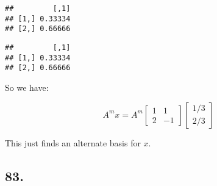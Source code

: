 \documentclass[]{article}
\newenvironment{Shaded}{\begin{snugshade}}{\end{snugshade}}
\newcommand{\DecValTok}[1]{\textcolor[rgb]{0.69,0.50,0.00}{#1}}
\newcommand{\NormalTok}[1]{\textcolor[rgb]{0.12,0.11,0.11}{#1}}
\newcommand{\OperatorTok}[1]{\textcolor[rgb]{0.12,0.11,0.11}{#1}}
\newcommand{\StringTok}[1]{\textcolor[rgb]{0.75,0.01,0.01}{#1}}
\newcommand{\m}[1]{\begin{bmatrix}#1\end{bmatrix}}
\begin{document}
\begin{verbatim}
##         [,1]
## [1,] 0.33334
## [2,] 0.66666
\end{verbatim}

\begin{Shaded}
\end{Shaded}

\begin{verbatim}
##         [,1]
## [1,] 0.33334
## [2,] 0.66666
\end{verbatim}

So we have:

\[A^mx=A^m\m{1&1\\
2&-1}\m{1/3\\2/3}\]

This just finds an alternate basis for \(x\).

\hypertarget{section-60}{%
\subsection{83.}\label{section-60}}
\end{document}
